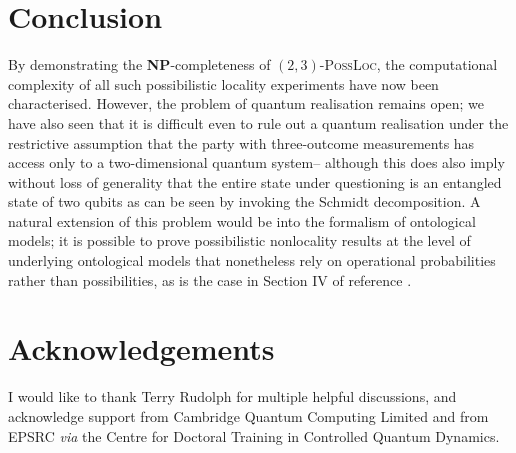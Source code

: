 \documentclass[reprint]{revtex4-1}
\theoremstyle{definition}
\begin{document}
 \section{Conclusion}
 
 By demonstrating the \textbf{NP}-completeness of $(2,3)$-\textsc{PossLoc}, the computational complexity of all such possibilistic locality experiments have now been characterised. However, the problem of quantum realisation remains open; we have also seen that it is difficult even to rule out a quantum realisation under the restrictive assumption that the party with three-outcome measurements has access only to a two-dimensional quantum system-- although this does also imply without loss of generality that the entire state under questioning is an entangled state of two qubits as can be seen by invoking the Schmidt decomposition. A natural extension of this problem would be into the formalism of ontological models; it is possible to prove possibilistic nonlocality results at the level of underlying ontological models that nonetheless rely on operational probabilities rather than possibilities, as is the case in Section IV of reference  \cite{Jevt2015}.

\section*{Acknowledgements}

I would like to thank Terry Rudolph for multiple helpful discussions, and acknowledge support from Cambridge Quantum Computing Limited and from EPSRC \emph{via} the Centre for Doctoral Training in Controlled Quantum Dynamics.

{}

\end{document}
